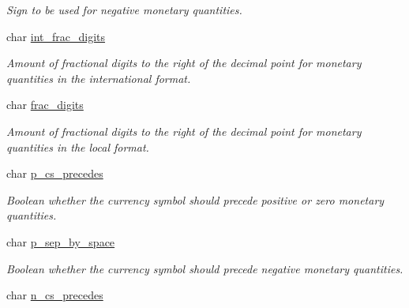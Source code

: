 \begin{DoxyCompactItemize}
\begin{DoxyCompactList}\small\item\em Sign to be used for negative monetary quantities. \end{DoxyCompactList}\item 
\hypertarget{structlconv_a6b652f28cafc3092258b47c8099fe905}{char \hyperlink{structlconv_a6b652f28cafc3092258b47c8099fe905}{int\-\_\-frac\-\_\-digits}}\label{structlconv_a6b652f28cafc3092258b47c8099fe905}

\begin{DoxyCompactList}\small\item\em Amount of fractional digits to the right of the decimal point for monetary quantities in the international format. \end{DoxyCompactList}\item 
\hypertarget{structlconv_aa16e32ff4dcc95445742b5b165ffb071}{char \hyperlink{structlconv_aa16e32ff4dcc95445742b5b165ffb071}{frac\-\_\-digits}}\label{structlconv_aa16e32ff4dcc95445742b5b165ffb071}

\begin{DoxyCompactList}\small\item\em Amount of fractional digits to the right of the decimal point for monetary quantities in the local format. \end{DoxyCompactList}\item 
\hypertarget{structlconv_af0651922c77fc926609bdd8746784e63}{char \hyperlink{structlconv_af0651922c77fc926609bdd8746784e63}{p\-\_\-cs\-\_\-precedes}}\label{structlconv_af0651922c77fc926609bdd8746784e63}

\begin{DoxyCompactList}\small\item\em Boolean whether the currency symbol should precede positive or zero monetary quantities. \end{DoxyCompactList}\item 
\hypertarget{structlconv_a3ae3cb36f4426158e4ab2ea6dc4278ad}{char \hyperlink{structlconv_a3ae3cb36f4426158e4ab2ea6dc4278ad}{p\-\_\-sep\-\_\-by\-\_\-space}}\label{structlconv_a3ae3cb36f4426158e4ab2ea6dc4278ad}

\begin{DoxyCompactList}\small\item\em Boolean whether the currency symbol should precede negative monetary quantities. \end{DoxyCompactList}\item 
\hypertarget{structlconv_ad118b68a229527f7e96538ac875169ad}{char \hyperlink{structlconv_ad118b68a229527f7e96538ac875169ad}{n\-\_\-cs\-\_\-precedes}}\label{structlconv_ad118b68a229527f7e96538ac875169ad}


\end{DoxyCompactItemize}
